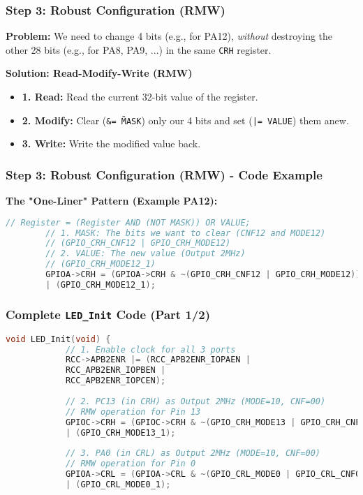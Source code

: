 \documentclass{beamer}
\begin{document}
\begin{frame}
	\frametitle{Step 3: Robust Configuration (RMW)}
	\textbf{Problem:} We need to change 4 bits (e.g., for PA12),
	\textit{without} destroying the other 28 bits (e.g., for PA8, PA9, ...) in the same 
	\texttt{CRH} register.
	
	\medskip
	\textbf{Solution: Read-Modify-Write (RMW)}
	\begin{itemize}
		\item \textbf{1. Read:} Read the current 32-bit value of the register.
		\item \textbf{2. Modify:} Clear (\texttt{\&= \~MASK}) only our 4 bits
		and set (\texttt{|= VALUE}) them anew.
		\item \textbf{3. Write:} Write the modified value back.
	\end{itemize}
\end{frame}

\begin{frame}[fragile]
	\frametitle{Step 3: Robust Configuration (RMW) - Code Example}
	\textbf{The "One-Liner" Pattern (Example PA12):}
	\begin{lstlisting}[language=C, style=mystyle, basicstyle=\scriptsize]
		// Register = (Register AND (NOT MASK)) OR VALUE;
		// 1. MASK: The bits we want to clear (CNF12 and MODE12)
		// (GPIO_CRH_CNF12 | GPIO_CRH_MODE12)
		// 2. VALUE: The new value (Output 2MHz)
		// (GPIO_CRH_MODE12_1)
		GPIOA->CRH = (GPIOA->CRH & ~(GPIO_CRH_CNF12 | GPIO_CRH_MODE12))
		| (GPIO_CRH_MODE12_1);
	\end{lstlisting}
\end{frame}


\begin{frame}[fragile]
	\frametitle{Complete \texttt{LED\_Init} Code (Part 1/2)}
	\begin{lstlisting}[language=C, style=mystyle, basicstyle=\scriptsize]
		void LED_Init(void) {
			// 1. Enable clock for all 3 ports
			RCC->APB2ENR |= (RCC_APB2ENR_IOPAEN |
			RCC_APB2ENR_IOPBEN |
			RCC_APB2ENR_IOPCEN);
			
			// 2. PC13 (in CRH) as Output 2MHz (MODE=10, CNF=00)
			// RMW operation for Pin 13
			GPIOC->CRH = (GPIOC->CRH & ~(GPIO_CRH_MODE13 | GPIO_CRH_CNF13))
			| (GPIO_CRH_MODE13_1);
			
			// 3. PA0 (in CRL) as Output 2MHz (MODE=10, CNF=00)
			// RMW operation for Pin 0
			GPIOA->CRL = (GPIOA->CRL & ~(GPIO_CRL_MODE0 | GPIO_CRL_CNF0))
			| (GPIO_CRL_MODE0_1);
		\end{lstlisting}
	\end{frame}
	
\end{document}
